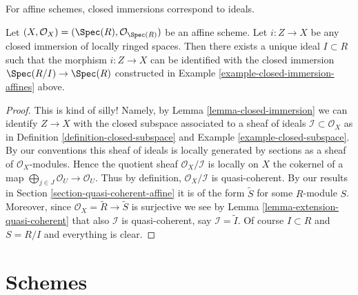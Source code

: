 \begin{lemma}
\label{lemma-closed-immersion-affine-case}
\begin{slogan}
For affine schemes, closed immersions correspond to ideals.
\end{slogan}
Let $(X, \mathcal{O}_X) = (\Spec(R), \mathcal{O}_{\Spec(R)})$
be an affine scheme. Let $i : Z \to X$ be any closed immersion
of locally ringed spaces. Then there exists a unique ideal
$I \subset R$ such that the morphism $i : Z \to X$ can be identified
with the closed immersion $\Spec(R/I) \to \Spec(R)$
constructed in Example \ref{example-closed-immersion-affines} above.
\end{lemma}

\begin{proof}
This is kind of silly! Namely, by Lemma \ref{lemma-closed-immersion}
we can identify $Z \to X$ with the closed subspace associated to
a sheaf of ideals $\mathcal{I} \subset \mathcal{O}_X$ as in
Definition \ref{definition-closed-subspace} and
Example \ref{example-closed-subspace}.
By our conventions this sheaf of ideals is locally generated
by sections as a sheaf of $\mathcal{O}_X$-modules.
Hence the quotient sheaf $\mathcal{O}_X / \mathcal{I}$
is locally on $X$ the cokernel
of a map $\bigoplus_{j \in J} \mathcal{O}_U \to \mathcal{O}_U$.
Thus by definition, $\mathcal{O}_X / \mathcal{I}$ is quasi-coherent.
By our results in Section \ref{section-quasi-coherent-affine}
it is of the form $\widetilde S$ for some $R$-module $S$.
Moreover, since $\mathcal{O}_X = \widetilde R \to \widetilde S$
is surjective we see by Lemma \ref{lemma-extension-quasi-coherent}
that also $\mathcal{I}$ is quasi-coherent, say $\mathcal{I} = \widetilde I$.
Of course $I \subset R$ and $S = R/I$ and everything is clear.
\end{proof}













\section{Schemes}
\label{section-schemes}

